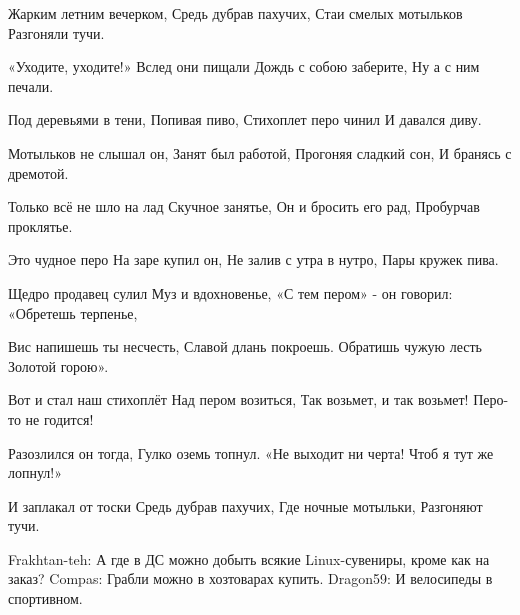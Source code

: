Жарким летним вечерком,
Средь дубрав пахучих,
Стаи смелых мотыльков
Разгоняли тучи.

«Уходите, уходите!»
Вслед они пищали
Дождь с собою заберите,
Ну а с ним печали.

Под деревьями в тени,
Попивая пиво,
Стихоплет перо чинил
И давался диву.

Мотыльков не слышал он,
Занят был работой,
Прогоняя сладкий сон,
И бранясь с дремотой.

Только всё не шло на лад
Скучное занятье,
Он и бросить его рад,
Пробурчав проклятье.

Это чудное перо
На заре купил он,
Не залив с утра в нутро,
Пары кружек пива.

Щедро продавец сулил
Муз и вдохновенье,
«С тем пером» - он говорил:
«Обретешь терпенье,

Вис напишешь ты несчесть,
Славой длань покроешь.
Обратишь чужую лесть
Золотой горою».

Вот и стал наш стихоплёт
Над пером возиться,
Так возьмет, и так возьмет!
Перо-то не годится!

Разозлился он тогда,
Гулко оземь топнул.
«Не выходит ни черта!
Чтоб я тут же лопнул!»

И заплакал от тоски
Средь дубрав пахучих,
Где ночные мотыльки,
Разгоняют тучи.



Frakhtan-teh: А где в ДС можно добыть всякие Linux-сувениры, кроме как на заказ?
Compas: Грабли можно в хозтоварах купить.
Dragon59: И велосипеды в спортивном.

